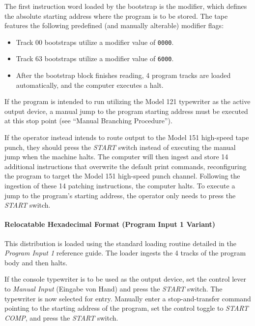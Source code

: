 \begin{enumerate}
    The first instruction word loaded by the bootstrap is the modifier, which defines the absolute starting address where the program is to be stored. The tape features the following predefined (and manually alterable) modifier flags:
    \begin{itemize}
        \item Track 00 bootstraps utilize a modifier value of \texttt{0000}.
        \item Track 63 bootstraps utilize a modifier value of \texttt{6000}.
        \item After the bootstrap block finishes reading, 4 program tracks are loaded automatically, and the computer executes a halt.
     \end{itemize}
    If the program is intended to run utilizing the Model 121 typewriter as the active output device, a manual jump to the program starting address must be executed at this stop point (see ``Manual Branching Procedure''). 

    If the operator instead intends to route output to the Model 151 high-speed tape punch, they should press the \textit{START} switch instead of executing the manual jump when the machine halts. The computer will then ingest and store 14 additional instructions that overwrite the default print commands, reconfiguring the program to target the Model 151 high-speed punch channel. Following the ingestion of these 14 patching instructions, the computer halts. To execute a jump to the program's starting address, the operator only needs to press the \textit{START} switch.

    \paragraph{Relocatable Hexadecimal Format (Program Input 1 Variant)}
    This distribution is loaded using the standard loading routine detailed in the \textit{Program Input 1} reference guide. The loader ingests the 4 tracks of the program body and then halts. 
    
    If the console typewriter is to be used as the output device, set the control lever to \textit{Manual Input} (Eingabe von Hand) and press the \textit{START} switch. The typewriter is now selected for entry. Manually enter a stop-and-transfer command pointing to the starting address of the program, set the control toggle to \textit{START COMP}, and press the \textit{START} switch.


\end{enumerate}
